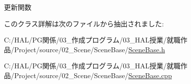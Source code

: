 更新関数 



このクラス詳解は次のファイルから抽出されました\+:\begin{DoxyCompactItemize}
\item 
C\+:/\+H\+A\+L/\+P\+G関係/03\+\_\+作成プログラム/03\+\_\+\+H\+A\+L授業/就職作品/\+Project/source/02\+\_\+\+Scene/\+Scene\+Base/\mbox{\hyperlink{_scene_base_8h}{Scene\+Base.\+h}}\item 
C\+:/\+H\+A\+L/\+P\+G関係/03\+\_\+作成プログラム/03\+\_\+\+H\+A\+L授業/就職作品/\+Project/source/02\+\_\+\+Scene/\+Scene\+Base/\mbox{\hyperlink{_scene_base_8cpp}{Scene\+Base.\+cpp}}\end{DoxyCompactItemize}
